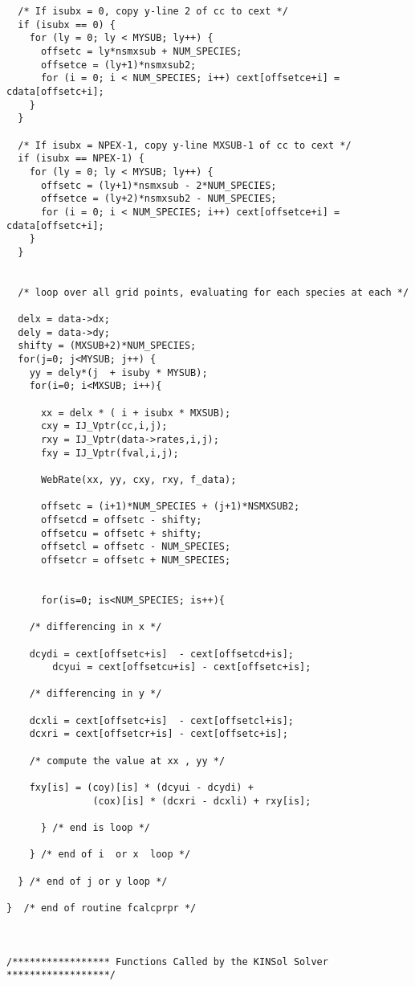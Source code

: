 \begin{verbatim}
  /* If isubx = 0, copy y-line 2 of cc to cext */
  if (isubx == 0) {
    for (ly = 0; ly < MYSUB; ly++) {
      offsetc = ly*nsmxsub + NUM_SPECIES;
      offsetce = (ly+1)*nsmxsub2;
      for (i = 0; i < NUM_SPECIES; i++) cext[offsetce+i] = cdata[offsetc+i];
    }
  }

  /* If isubx = NPEX-1, copy y-line MXSUB-1 of cc to cext */
  if (isubx == NPEX-1) {
    for (ly = 0; ly < MYSUB; ly++) {
      offsetc = (ly+1)*nsmxsub - 2*NUM_SPECIES;
      offsetce = (ly+2)*nsmxsub2 - NUM_SPECIES;
      for (i = 0; i < NUM_SPECIES; i++) cext[offsetce+i] = cdata[offsetc+i];
    }
  }


  /* loop over all grid points, evaluating for each species at each */

  delx = data->dx;
  dely = data->dy;
  shifty = (MXSUB+2)*NUM_SPECIES;
  for(j=0; j<MYSUB; j++) {
    yy = dely*(j  + isuby * MYSUB);
    for(i=0; i<MXSUB; i++){

      xx = delx * ( i + isubx * MXSUB);
      cxy = IJ_Vptr(cc,i,j);
      rxy = IJ_Vptr(data->rates,i,j);
      fxy = IJ_Vptr(fval,i,j);
      
      WebRate(xx, yy, cxy, rxy, f_data);

      offsetc = (i+1)*NUM_SPECIES + (j+1)*NSMXSUB2;
      offsetcd = offsetc - shifty;
      offsetcu = offsetc + shifty;
      offsetcl = offsetc - NUM_SPECIES;
      offsetcr = offsetc + NUM_SPECIES;

      
      for(is=0; is<NUM_SPECIES; is++){

	/* differencing in x */

	dcydi = cext[offsetc+is]  - cext[offsetcd+is];
        dcyui = cext[offsetcu+is] - cext[offsetc+is];
	
	/* differencing in y */

	dcxli = cext[offsetc+is]  - cext[offsetcl+is];
	dcxri = cext[offsetcr+is] - cext[offsetc+is];

	/* compute the value at xx , yy */

	fxy[is] = (coy)[is] * (dcyui - dcydi) +
	           (cox)[is] * (dcxri - dcxli) + rxy[is];

      } /* end is loop */

    } /* end of i  or x  loop */

  } /* end of j or y loop */

}  /* end of routine fcalcprpr */



/***************** Functions Called by the KINSol Solver ******************/



\end{verbatim}
